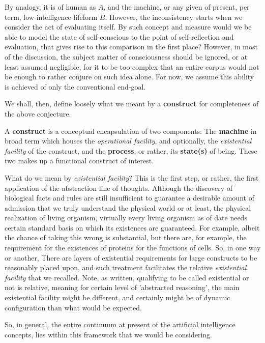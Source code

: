 By analogy, it is of human as $A$, and the machine, or any given of present, per term, low-intelligence lifeform $B$. However, the inconsistency starts when we consider the act of evaluating itself. By such concept and measure would we be able to model the state of self-conscious to the point of self-reflection and evaluation, that gives rise to this comparison in the first place? However, in most of the discussion, the subject matter of consciousness should be ignored, or at least assumed negligible, for it to be too complex that an entire corpus would not be enough to rather conjure on such idea alone. For now, we assume this ability is achieved of only the conventional end-goal.

We shall, then, define loosely what we meant by a \textbf{construct} for completeness of the above conjecture.

\begin{definition}[Construct]
    A \textbf{construct} is a conceptual encapsulation of two components: The \textbf{machine} in broad term which houses the \textit{operational facility}, and optionally, the \textit{existential facility} of the construct, and the \textbf{process}, or rather, its \textbf{state(s)} of being. These two makes up a functional construct of interest.
\end{definition}

What do we mean by \textit{existential facility}? This is the first step, or rather, the first application of the abstraction line of thoughts. Although the discovery of biological facts and rules are still insufficient to guarantee a desirable amount of admission that we truly understand the physical world or at least, the physical realization of living organism, virtually every living organism as of date needs certain standard basis on which its existences are guaranteed. For example, albeit the chance of taking this wrong is substantial, but there are, for example, the requirement for the existences of proteins for the functions of cells. So, in one way or another, There are layers of existential requirements for large constructs to be reasonably placed upon, and such treatment facilitates the relative \textit{existential facility} that we recalled. Note, as written, qualifying to be called existential or not is relative, meaning for certain level of 'abstracted reasoning', the main existential facility might be different, and certainly might be of dynamic configuration than what would be expected.

So, in general, the entire continuum at present of the artificial intelligence concepts, lies within this framework that we would be considering. 

